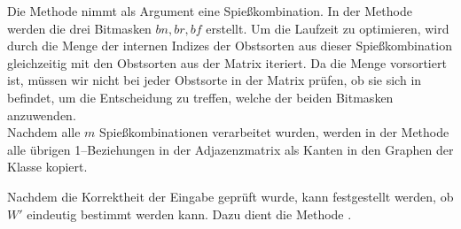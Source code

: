 Die Methode  nimmt als Argument eine Spießkombination. 
In der Methode werden die drei Bitmasken $bn, br, bf$ erstellt.
Um die Laufzeit zu optimieren, wird durch die Menge der internen Indizes der Obstsorten 
aus dieser Spießkombination gleichzeitig mit den Obstsorten aus der Matrix iteriert.
Da die Menge  vorsortiert ist, müssen wir nicht bei jeder Obstsorte in der Matrix
prüfen, ob sie sich in  befindet, um die Entscheidung zu treffen, welche der beiden
Bitmasken anzuwenden.\\
Nachdem alle $m$ Spießkombinationen verarbeitet wurden, werden in der Methode 
alle übrigen 1--Beziehungen in der Adjazenzmatrix
als Kanten in den Graphen  der Klasse  kopiert.\\


Nachdem die Korrektheit der Eingabe geprüft wurde, kann festgestellt werden, ob $W'$ eindeutig
bestimmt werden kann. Dazu dient die Methode .
